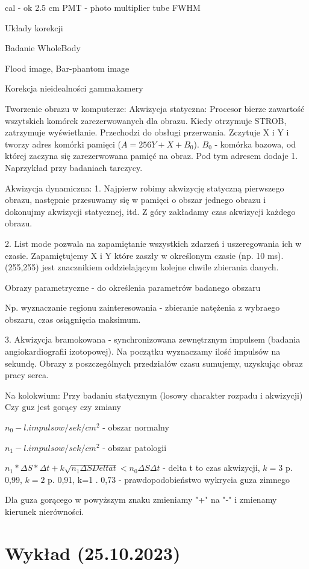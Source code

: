 \documentclass{article}
\begin{document}
cal - ok 2.5 cm
PMT - photo multiplier tube
FWHM

Układy korekcji

Badanie WholeBody

Flood image, Bar-phantom image

Korekcja nieidealności gammakamery

Tworzenie obrazu w komputerze:
Akwizycja statyczna:
Procesor bierze zawartość wszytskich komórek zarezerwowanych dla obrazu. Kiedy otrzymuje STROB, zatrzymuje wyświetlanie. Przechodzi do obsługi przerwania. Zczytuje X i Y i tworzy adres komórki pamięci ($A = 256Y + X + B_0$). $B_0$ - komórka bazowa, od której zaczyna się zarezerwowana pamięć na obraz. Pod tym adresem dodaje 1. Naprzykład przy badaniach tarczycy.

Akwizycja dynamiczna:
1. Najpierw robimy akwizycję statyczną pierwszego obrazu, następnie przesuwamy się w pamięci o obszar jednego obrazu i dokonujmy akwizycji statycznej, itd. Z góry zakładamy czas akwizycji każdego obrazu.

2. List mode pozwala na zapamiętanie wszystkich zdarzeń i uszeregowania ich w czasie. Zapamiętujemy X i Y które zaszły w określonym czasie (np. 10 ms). (255,255) jest znacznikiem oddzielającym kolejne chwile zbierania danych.

Obrazy parametryczne - do określenia parametrów badanego obszaru

Np. wyznaczanie regionu zainteresowania - zbieranie natężenia z wybraego obszaru, czas osiągnięcia maksimum.

3. Akwizycja bramokowana - synchronizowana zewnętrznym impulsem (badania angiokardiografii izotopowej). Na początku wyznaczamy ilość impulsów na sekundę. Obrazy z poszczególnych przedziałów czasu sumujemy, uzyskując obraz pracy serca.

Na kolokwium:
Przy badaniu statycznym (losowy charakter rozpadu i akwizycji)
Czy guz jest gorący czy zmiany

$n_0 - l.impulsow/sek/cm^2$ - obszar normalny

$n_1 - l.impulsow/sek/cm^2$ - obszar patologii

$n_1 * \Delta S * \Delta t + k\sqrt{n_1 \Delta S Delta t} < n_0 \Delta S \Delta t$ - delta t to czas akwizycji, $k=3$ p. 0,99, $k=2$ p. 0,91, k=1 . 0,73 - prawdopodobieństwo wykrycia guza zimnego

Dla guza gorącego w powyższym znaku zmieniamy "+" na "-" i zmienamy kierunek nierówności.

\section{Wykład (25.10.2023)}
\end{document}
